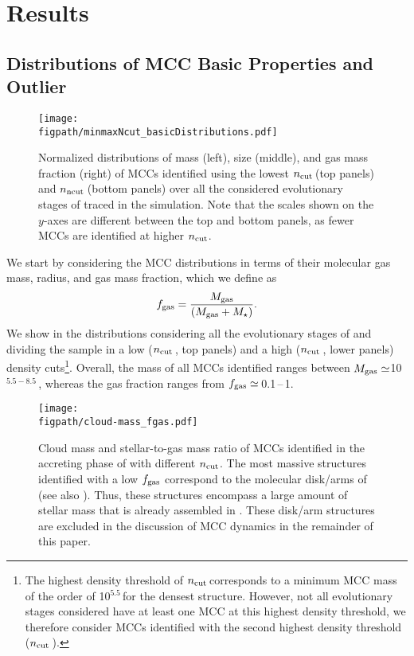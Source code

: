 \IfFileExists{emulateapjlegacy.cls}{\documentclass[iop]{emulateapjlegacy}}{\documentclass[iop]{emulateapj}}
\def\figpath{./Fig}
\begin{document}
\section{Results}\label{sec:results}

\subsection{Distributions of MCC Basic Properties and Outlier} \label{sec:dist}
\begin{figure*}[htbp]
\centering
\texttt{[image: \\figpath/minmaxNcut\_basicDistributions.pdf]}
\caption{Normalized distributions of mass (left), size (middle), and gas mass fraction (right) of MCCs identified using the lowest 
$n_{\rm cut}$\,\cc (top panels) and $n_{\rm ncut}$\,\cc (bottom panels) over all the considered evolutionary stages of \flower traced in the simulation. Note that the scales shown on the $y$-axes are different between the top and bottom panels, as fewer MCCs are identified at higher $n_{\rm cut}$.
\label{fig:dist}}
\end{figure*}

We start by considering the MCC distributions in terms of their molecular gas mass, radius, and gas mass fraction, which we define as
\begin{equation}
f_{\rm gas} = \frac{M_{\rm gas}} {\left(M_{\rm gas} + M_\star\right)}.
\end{equation}
%
We show in  the distributions considering all the evolutionary stages of \flower and dividing the sample in a low 
($n_{\rm cut}$\,\cc, top panels) and a high ($n_{\rm cut}$\,\cc, lower panels) density cuts\footnote{The highest density threshold of $n_{\rm cut}$\,\cc corresponds to a minimum MCC mass of the order of 10$^{5.5}$\,\Msun for the densest structure. However, not all evolutionary stages considered have at least one MCC at this highest density threshold, we therefore consider MCCs identified with the second highest density threshold ($n_{\rm cut}$\,\cc).}.
%
Overall, the mass of all MCCs identified ranges between $M_{\rm gas}\simeq$10$^{5.5-8.5}$\,\Msun, 
whereas the gas fraction ranges from $f_{\rm gas} \simeq$\,0.1\,--\,1.

\begin{figure}
\centering
\texttt{[image: \\figpath/cloud-mass\_fgas.pdf]}
\caption{Cloud mass and stellar-to-gas mass ratio of MCCs identified in the accreting phase of \flower with different $n_{\rm cut}$. The most massive structures
identified with a low $f_{\rm gas}$ correspond to the molecular disk/arms of \flower (see also ).
%
Thus, these structures encompass a large amount of stellar mass that is already assembled in \flower. These disk/arm structures are excluded 
in the discussion of MCC dynamics in the remainder of this paper. 
\label{fig:stellarRatio16}}
\end{figure}
\end{document}
